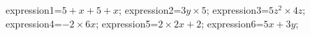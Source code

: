 \documentclass[exercice]{thedocument}%
\begin{document}
%
    \>expression1=$5+x+5+x$;%
    \>expression2=$3y\times5$;%
    \>expression3=$5z^2\times4z$;%
    \>expression4=$-2\times6x$;%
    \>expression5=$2\times2x+2$;%
    \>expression6=$5x+3y$;%
\end{document}

